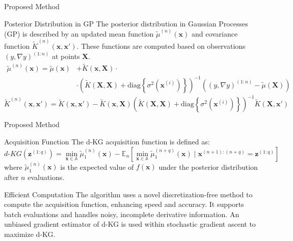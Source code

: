 \documentclass{beamer}
\begin{document}
\begin{frame}{Proposed Method}
\begin{block}{Posterior Distribution in GP}
The posterior distribution in Gaussian Processes (GP) is described by an updated mean function \(\tilde{\mu}^{(n)}(\mathbf{x})\) and covariance function \(\tilde{K}^{(n)}(\mathbf{x}, \mathbf{x}')\). These functions are computed based on observations \((y, \nabla y)^{(1:n)}\) at points \(\mathbf{X}\).
\begin{align*}
    \tilde{\mu}^{(n)}(\mathbf{x}) = \tilde{\mu}(\mathbf{x}) &+ \tilde{K} (\mathbf{x}, \mathbf{X}) \cdot \\
    &\cdot \left( \tilde{K}(\mathbf{X}, \mathbf{X}) + \text{diag} \left\{ \sigma^2(\mathbf{x}^{(i)}) \right\} \right)^{-1}
  \left( (y, \nabla y)^{(1:n)} - \tilde{\mu}(\mathbf{X}) \right) \nonumber
\end{align*}
\[
\tilde{K}^{(n)}(\mathbf{x}, \mathbf{x}') = \tilde{K}(\mathbf{x}, \mathbf{x}') - \tilde{K}(\mathbf{x}, \mathbf{X}) \left( \tilde{K}(\mathbf{X}, \mathbf{X}) + \text{diag} \left\{ \sigma^2(\mathbf{x}^{(i)}) \right\} \right)^{-1} \tilde{K}(\mathbf{X}, \mathbf{x}')
\]
\end{block}
\end{frame}

\begin{frame}{Proposed Method}
    \begin{block}{Acquisition Function}
        The d-KG acquisition function is defined as:
        \[
        d\text{-}KG\left(\mathbf{z}^{(1: q)}\right) = \min_{\mathbf{x} \in \mathbb{A}} \tilde{\mu}_{1}^{(n)}(\mathbf{x}) - \mathbb{E}_{n}\left[\min_{\mathbf{x} \in \mathbb{A}} \tilde{\mu}_{1}^{(n+q)}(\mathbf{x}) \mid \mathbf{x}^{(n+1):(n+q)} = \mathbf{z}^{(1: q)}\right]
        \]
        where $\tilde{\mu}_{1}^{(n)}(\mathbf{x})$ is the expected value of $f(\mathbf{x})$ under the posterior distribution after $n$ evaluations.
    \end{block}
        \begin{block}{Efficient Computation}
        The algorithm uses a novel discretization-free method to compute the acquisition function, enhancing speed and accuracy. It supports batch evaluations and handles noisy, incomplete derivative information. An unbiased gradient estimator of d-KG is used within stochastic gradient ascent to maximize d-KG.
    \end{block}
\end{frame}
\end{document}
